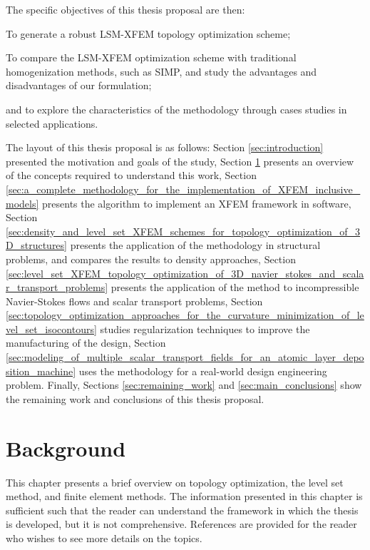 The specific objectives of this thesis proposal are then:
\begin{inparaenum}[(i)]
	\item To generate a robust LSM-XFEM topology optimization scheme;
	\item To compare the LSM-XFEM optimization scheme with traditional homogenization methods, such as SIMP, and study the advantages and disadvantages of our formulation;
	\item and to explore the characteristics of the methodology through cases studies in selected applications.
\end{inparaenum}

The layout of this thesis proposal is as follows: Section \ref{sec:introduction} presented the motivation and goals of the study, Section \ref{sec:background} presents an overview of the concepts required to understand this work, Section \ref{sec:a_complete_methodology_for_the_implementation_of_XFEM_inclusive_models} presents the algorithm to implement an XFEM framework in software, Section \ref{sec:density_and_level_set_XFEM_schemes_for_topology_optimization_of_3D_structures} presents the application of the methodology in structural problems, and compares the results to density approaches, Section \ref{sec:level_set_XFEM_topology_optimization_of_3D_navier_stokes_and_scalar_transport_problems} presents the application of the method to incompressible Navier-Stokes flows and scalar transport problems, Section \ref{sec:topology_optimization_approaches_for_the_curvature_minimization_of_level_set_isocontours} studies regularization techniques to improve the manufacturing of the design, Section \ref{sec:modeling_of_multiple_scalar_transport_fields_for_an_atomic_layer_deposition_machine} uses the methodology for a real-world design engineering problem. Finally, Sections \ref{sec:remaining_work} and \ref{sec:main_conclusions} show the remaining work and conclusions of this thesis proposal.


\chapter{Background}
\label{sec:background}

This chapter presents a brief overview on topology optimization, the level set method, and finite element methods. The information presented in this chapter is sufficient such that the reader can understand the framework in which the thesis is developed, but it is not comprehensive. References are provided for the reader who wishes to see more details on the topics.

